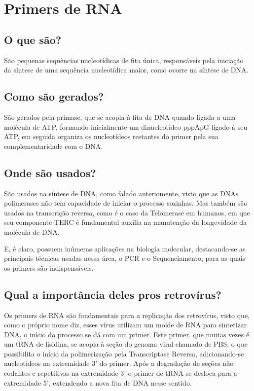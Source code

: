 \documentclass[
]{book}
\begin{document}
\hypertarget{primers-de-rna}{%
\chapter{Primers de RNA}\label{primers-de-rna}}

\hypertarget{o-que-suxe3o}{%
\section{O que são?}\label{o-que-suxe3o}}

São pequenas sequências nucleotídicas de fita única, responsáveis pela iniciação da síntese de uma sequência nucleotídica maior,
como ocorre na síntese de DNA.

\hypertarget{como-suxe3o-gerados}{%
\section{Como são gerados?}\label{como-suxe3o-gerados}}

São gerados pela primase, que se acopla à fita de DNA quando ligada a uma molécula de ATP, formando inicialmente um dinucleotídeo pppApG ligado à seu ATP, em seguida organiza os nucleotídeos restantes do primer pela sua complementaridade com o DNA.

\hypertarget{onde-suxe3o-usados}{%
\section{Onde são usados?}\label{onde-suxe3o-usados}}

São usados na síntese de DNA, como falado anteriomente, visto que as DNAs polimerases não tem capacidade de iniciar o processo sozinhas. Mas também são usados na transcrição reversa, como é o caso da Telomerase em humanos, em que seu componente TERC é fundamental auxilia na manutenção da longevidade da molécula de DNA.

E, é claro, possuem inúmeras aplicações na biologia molecular, destacando-se as principais técnicas usadas nessa área, o PCR e o Sequenciamento, para as quais os primers são indispensáveis.

\hypertarget{qual-a-importuxe2ncia-deles-pros-retrovuxedrus}{%
\section{Qual a importância deles pros retrovírus?}\label{qual-a-importuxe2ncia-deles-pros-retrovuxedrus}}

Os primers de RNA são fundamentais para a replicação dos retrovírus, visto que, como o próprio nome diz, esses vírus utilizam um molde de RNA para sintetizar DNA, o início do processo se dá com um primer. Este primer, que muitas vezes é um tRNA de lisidina, se acopla à seção do genoma viral chamado de PBS, o que possibilita o início da polimerização pela Transcriptase Reversa, adicionando-se nucleotídeos na extremidade 3' do primer. Após a degradação de seções não codantes e repetitivas na extremidade 3' o primer de tRNA se desloca para a extremidade 5', extendendo a nova fita de DNA nesse sentido.
\end{document}

